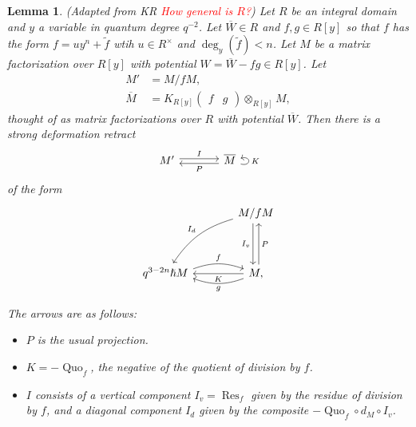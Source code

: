 \documentclass{article}
\DeclareMathOperator{\Res}{Res}
\DeclareMathOperator{\Quo}{Quo}
\newcommand{\sdr}[5]{%
  \begin{tikzcd}[column sep=large, ampersand replacement=\&]
    {#1} \arrow[r, "{#3}", shift left=0.5ex,] \arrow[r, leftarrow, "{#4}", shift right=0.5ex, swap] \& 
    #2 \arrow[loop right, distance=1em, in=15, out=-15, "{#5}",swap]
  \end{tikzcd}%
}
\newcommand{\kmf}[2]{
	K_{#1}{\begin{pmatrix}
			#2
		\end{pmatrix}
	}	
}
\theoremstyle{plain} %
\newtheorem{lemma}[theorem]{Lemma}
\theoremstyle{definition} %
\theoremstyle{remark} %
\begin{document}
\begin{lemma}\label{sdrlemma}    (Adapted from KR \textcolor{red}{How general is $R$?}) Let $R$ be an integral domain and $y$ a variable in quantum degree $q^{-2}$. Let $\overline W\in R$ and $f,g\in R[y]$ so that $f$ has the form $f=uy^n+\tilde f$ wtih $u\in R^\times$ and $\deg_y(\tilde f)<n$. Let $M$ be a matrix factorization over $R[y]$ with potential $W=\overline W-fg\in R[y]$. Let 
\begin{align*}
	M'
	&
	=M/fM
	,
	\\
	\overline M 
	&
	= 
	\kmf{R[y]}{f & g}\otimes_{R[y]} M
	,
\end{align*}
thought of as matrix factorizations over $R$ with potential $\overline W$.
Then there is a strong deformation retract
$$
	\sdr{M'}{\overline M}{I}{P}{K}
$$
of the form
$$
	\begin{tikzcd}[column sep=large, ]
		&
		M/fM
		\ar[dd, shift right=0.6ex, "I_v", swap]
		\ar[dd, leftarrow, shift left=0.6ex, "P"]
		\arrow[ddl, "I_d", bend right=20, swap]
		\\
		\\
		q^{3-2n}\hslash M
		\arrow[r, "f", shift left=1ex, bend left=20, start anchor=east, end anchor=west]
		& 
		M\ar[l, "K"]
		\arrow[l, "g", shift left=1ex, bend left=20, start anchor=west, end anchor=east], 
	\end{tikzcd}
$$

	The arrows are as follows:
	\begin{itemize}
		\item $P$ is the usual projection.
		\item $K=-\Quo_f$, the negative of the quotient of division by $f$.
		\item $I$ consists of a vertical component $I_v=\Res_f$ given by the residue of division by $f$, and a diagonal component $I_d$ given by the composite $-\Quo_f\circ d_{M}\circ I_v$.
	\end{itemize}
\end{lemma}
\end{document}
